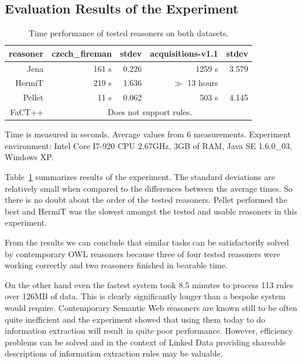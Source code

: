 \subsection{Evaluation Results of the Experiment}






\begin{table}
\begin{center}
\begin{tabular}{|r||r|r||r|r|}
\hline
reasoner & \textbf{czech\_fireman} & stdev & \textbf{acquisitions-v1.1} & stdev\\
\hline
\hline
Jena & 161 s & 0.226 & 1259 s & 3.579\\
\hline
HermiT & 219 s & 1.636 & $\gg$ 13 hours & \\
\hline
Pellet & 11 s & 0.062 & 503 s & 4.145\\
\hline
FaCT++ & \multicolumn{4}{|c|}{Does not support rules.}\\
\hline
\end{tabular}
\end{center}

Time is measured in seconds. Average values from 6 measurements. Experiment environment: Intel Core I7-920 CPU 2.67GHz, 3GB of RAM, Java SE 1.6.0\_03, Windows XP.

\caption{Time performance of tested reasoners on both datasets.}
\label{tab:results}
\end{table}

Table~\ref{tab:results} summarizes results of the experiment. The standard deviations are relatively small when compared to the differences between the average times.  So there is no doubt about the order of the tested reasoners. Pellet performed the best and HermiT was the slowest amongst the tested and usable reasoners in this experiment.

From the results we can conclude that similar tasks can be satisfactorily solved by contemporary OWL reasoners because three of four tested reasoners were working correctly and two reasoners finished in bearable time.

On the other hand even the fastest system took 8.5 minutes to process 113 rules over 126MB of data. This is clearly   significantly longer than a bespoke system would require. 
Contemporary Semantic Web reasoners are known still to be often quite inefficient and the experiment showed that using them today to do information extraction will result in quite poor performance. However, efficiency problems can be solved
and in the context of Linked Data providing shareable descriptions of information extraction rules may be valuable.





